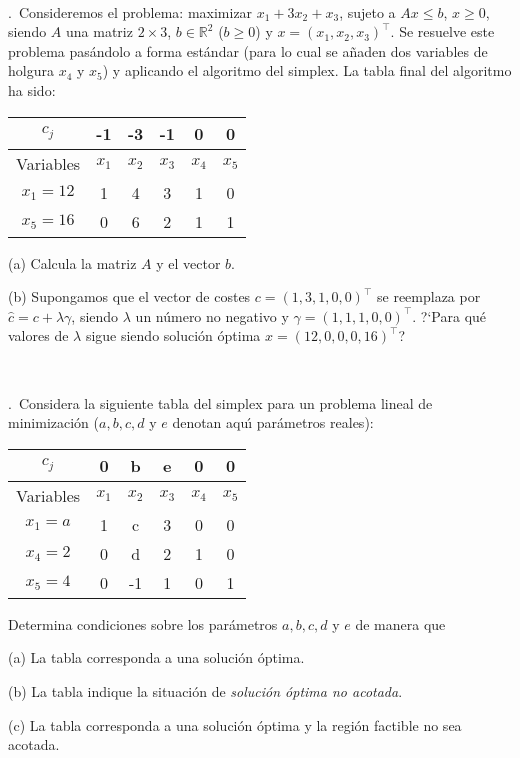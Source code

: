 \documentclass[11pt,a4paper,twoside]{article}
\newcounter{problem} \setcounter{problem}{1}
\newcommand{\ex}{\noindent {\sf \bf \theproblem}\addtocounter{problem}{1}.\ }
\begin{document}
\

\ex Consideremos el problema:
maximizar $x_1+3x_2+x_3$, sujeto a $Ax\leq b$, $x\geq 0$,
siendo $A$ una matriz $2\times 3$, $b\in\mathbb{R}^2$ ($b\geq 0$) y
$x=(x_1,x_2,x_3)^\top$.
Se resuelve este problema pas\'andolo a forma est\'andar
(para lo cual se a\~naden dos variables de holgura $x_4$ y $x_5$) y
aplicando el algoritmo del simplex. La tabla final del algoritmo ha
sido:

\begin{center}
\begin{tabular}{c||c|c|c|c|c}
$c_j$&-1&-3&-1&0&0\\
\hline
Variables&$x_1$&$x_2$&$x_3$&$x_4$&$x_5$\\
\hline
$x_1=12$&1&4&3&1&0\\
$x_5=16$&0&6&2&1&1\\
\end{tabular}
\end{center}

\begin{compactitem}
\item[(a)] Calcula la matriz $A$ y el vector $b$.
\item[(b)] Supongamos que el vector de costes $c=(1,3,1,0,0)^\top$ se reemplaza
por $\hat c=c+\lambda \gamma$, siendo $\lambda$ un n\'umero no negativo
y $\gamma=(1,1,1,0,0)^\top$. ?`Para qu\'e valores de $\lambda$ sigue siendo
soluci\'on \'optima $x=(12,0,0,0,16)^\top$?
\end{compactitem}


\

\ex Considera la siguiente tabla del simplex para un
problema  lineal de minimizaci\'on ($a,b,c,d$ y $e$
denotan aqu\'{\i} par\'ametros reales):

\begin{center}
\begin{tabular}{c||c|c|c|c|c}
$c_j$&0&b&e&0&0\\
\hline
Variables&$x_1$&$x_2$&$x_3$&$x_4$&$x_5$\\
\hline
$x_1=a$&1&c&3&0&0\\
$x_4=2$&0&d&2&1&0\\
$x_5=4$&0&-1&1&0&1\\
\end{tabular}
\end{center}

Determina condiciones sobre los par\'ametros $a,b,c,d$ y $e$ de manera que
\begin{compactitem}
\item[(a)] La tabla corresponda a una soluci\'on \'optima.
\item[(b)] La tabla indique la situaci\'on de \textit{soluci\'on \'optima no acotada}.
\item[(c)] La tabla corresponda a una soluci\'on \'optima y la regi\'on
factible  no sea acotada.
\end{compactitem}
\end{document}
